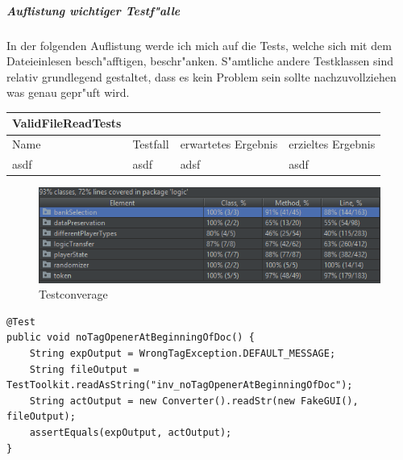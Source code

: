 \subparagraph{Auflistung wichtiger Testf"alle}
In der folgenden Auflistung werde ich mich auf die Tests, welche sich mit dem Dateieinlesen besch"afftigen, beschr"anken. S"amtliche andere Testklassen sind relativ grundlegend gestaltet, dass es kein Problem sein sollte nachzuvollziehen was genau gepr"uft wird. 

\bigbreak

\begin{tabular}{llll}
\toprule
ValidFileReadTests\\
\midrule
Name & Testfall & erwartetes Ergebnis & erzieltes Ergebnis\\
\midrule
asdf & asdf & adsf & asdf\\
\bottomrule
\end{tabular}
\label{tab:testfaelle}


\begin{figure}
	\centering
	\includegraphics{pics/testCoverage}
	\caption{Testconverage}
	\label{fig:testCoverage}
\end{figure}


\begin{lstlisting}[float,style=CodeHighlighting,caption=InvalidFileReadTests - test\_noTagOpenerAtBeginningOfDoc,label=lst:test_noTagOpenerAtBeginningOfDoc]
@Test
public void noTagOpenerAtBeginningOfDoc() {
    String expOutput = WrongTagException.DEFAULT_MESSAGE;
    String fileOutput = TestToolkit.readAsString("inv_noTagOpenerAtBeginningOfDoc");
    String actOutput = new Converter().readStr(new FakeGUI(), fileOutput);
    assertEquals(expOutput, actOutput);
}
\end{lstlisting}